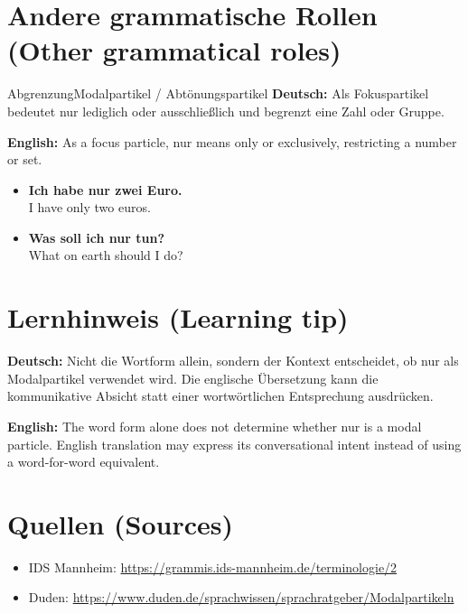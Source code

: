\documentclass[a4paper,11pt]{article}
\newcommand{\GermanText}[1]{\textbf{Deutsch: }#1\par}
\newcommand{\EnglishText}[1]{{\small\color{SoftGray}\textbf{English: }#1\par}}
\newcommand{\ExampleItem}[2]{\item \textbf{#1}\\{\small\color{SoftGray}#2}}
\begin{document}
\section{Andere grammatische Rollen \textnormal{(Other grammatical roles)}}
\begin{grammarentry}{Abgrenzung}{Modalpartikel / Abtönungspartikel}
\GermanText{Als Fokuspartikel bedeutet nur lediglich oder ausschließlich und begrenzt eine Zahl oder Gruppe.}
\EnglishText{As a focus particle, nur means only or exclusively, restricting a number or set.}
\end{grammarentry}
\begin{exbox}\begin{itemize}
\ExampleItem{Ich habe nur zwei Euro.}{I have only two euros.}
\ExampleItem{Was soll ich nur tun?}{What on earth should I do?}
\end{itemize}\end{exbox}
\section{Lernhinweis \textnormal{(Learning tip)}}
\GermanText{Nicht die Wortform allein, sondern der Kontext entscheidet, ob nur als Modalpartikel verwendet wird. Die englische Übersetzung kann die kommunikative Absicht statt einer wortwörtlichen Entsprechung ausdrücken.}
\EnglishText{The word form alone does not determine whether nur is a modal particle. English translation may express its conversational intent instead of using a word-for-word equivalent.}
\section{Quellen \textnormal{(Sources)}}
\begin{itemize}
\item IDS Mannheim: \url{https://grammis.ids-mannheim.de/terminologie/2}
\item Duden: \url{https://www.duden.de/sprachwissen/sprachratgeber/Modalpartikeln}
\end{itemize}
\end{document}

